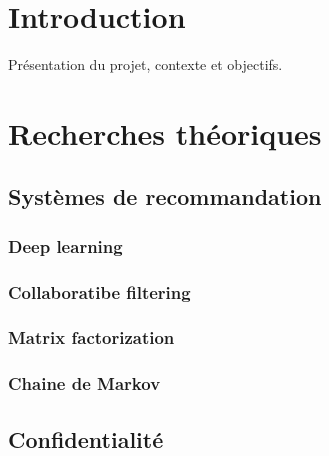 \documentclass{article}
\begin{document}
\tableofcontents
\newpage

\section*{Introduction}
Présentation du projet, contexte et objectifs.

\section{Recherches théoriques}
\subsection{Systèmes de recommandation}
\subsubsection{Deep learning}
\subsubsection{Collaboratibe filtering}
\subsubsection{Matrix factorization}
\subsubsection{Chaine de Markov}
\subsection{Confidentialité}
\end{document}
